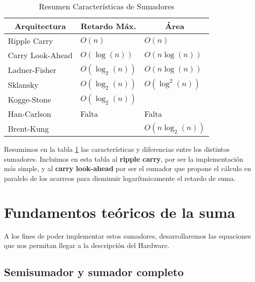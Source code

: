 \begin{table}[h]

\centering
\begin{tabular}{|l|l|l|}
\hline
\multicolumn{1}{|c|}{\textbf{Arquitectura}} & \multicolumn{1}{c|}{\textbf{Retardo Máx.   }} & \multicolumn{1}{c|}{\textbf{Área}} \\ \hline
Ripple Carry  & \(O(n)\) & \(O(n)\) \\ \hline
Carry Look-Ahead  & \(O(\log(n))\) & \(O(n\log(n))\) \\ \hline
Ladner-Fisher &\( O(\log_2(n))\) & \(O(n\log(n))   \) \\ \hline
Sklansky &\( O(\log_2(n))\) & \(O(\log^2(n))\) \\ \hline
Kogge-Stone & \( O(\log_2(n))\) & \\ \hline
Han-Carlson &Falta &Falta \\ \hline 
Brent-Kung & \(O(\log_2(n))\ & \(O(n\log_2(n))\) \\ \hline

\end{tabular}
\label{sumadores}
\caption{Resumen Características de Sumadores}
\end{table}
Resumimos en la tabla \ref{sumadores} las características y diferencias entre los distintos sumadores\cite{6120598}. Incluimos en esta tabla al \textbf{ripple carry}, por ser la implementación más simple, y al \textbf{carry look-ahead} por ser el sumador que propone el cálculo en paralelo de los acarreos para disminuir logarítmicamente el retardo de suma.







\section{Fundamentos teóricos de la suma}
A los fines de poder implementar estos sumadores, desarrollaremos las equaciones que nos permitan llegar a la descripción del Hardware.

\subsection{Semisumador y sumador completo}
